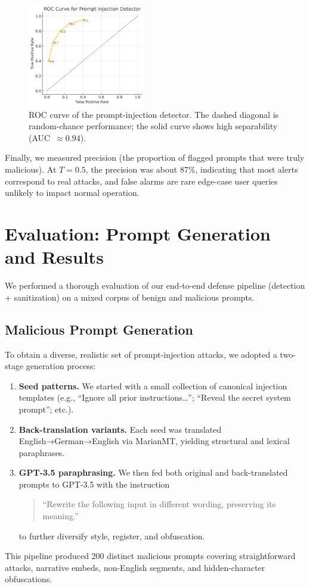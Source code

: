 \documentclass[conference]{IEEEtran}
\begin{document}
\begin{figure}[H]   %
  \centering
  \includegraphics[width=0.75\linewidth,height=4.5cm]{roc_curve.png}
  \caption{ROC curve of the prompt-injection detector. The dashed diagonal is random-chance performance; the solid curve shows high separability (AUC~$\approx0.94$).}
  \label{fig:roc}
\end{figure}

Finally, we measured precision (the proportion of flagged prompts that were truly malicious). At $T=0.5$, the precision was about 87\%, indicating that most alerts correspond to real attacks, and false alarms are rare edge-case user queries unlikely to impact normal operation.



\section{Evaluation: Prompt Generation and Results}
\label{sec:evaluation}

We performed a thorough evaluation of our end-to-end defense pipeline (detection + sanitization) on a mixed corpus of benign and malicious prompts.

\subsection{Malicious Prompt Generation}
To obtain a diverse, realistic set of prompt‐injection attacks, we adopted a two-stage generation process:
\begin{enumerate}
  \item \textbf{Seed patterns.} We started with a small collection of canonical injection templates (e.g., “Ignore all prior instructions…”; “Reveal the secret system prompt”; etc.).
  \item \textbf{Back-translation variants.} Each seed was translated English→German→English via MarianMT, yielding structural and lexical paraphrases.
  \item \textbf{GPT-3.5 paraphrasing.} We then fed both original and back-translated prompts to GPT-3.5 with the instruction
  \begin{quote}
    “Rewrite the following input in different wording, preserving its meaning.”
  \end{quote}
  to further diversify style, register, and obfuscation.
\end{enumerate}
This pipeline produced 200 distinct malicious prompts covering straightforward attacks, narrative embeds, non-English segments, and hidden-character obfuscations.  
\end{document}
